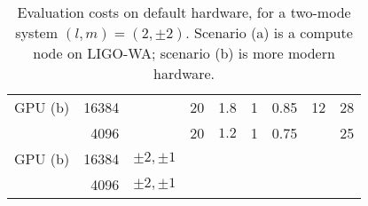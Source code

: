 \documentclass[twocolumn,prd,nofootinbib]{revtex4}
\begin{document}
\begin{table}
\begin{tabular}{lrr|ccccc|r}
GPU (b) & 16384 & & 20  & 1.8 & 1 & 0.85& 12 &28\\
       & 4096 & & 20 & $1.2 $ &  1  & 0.75 &  & 25\\ \hline
GPU (b) & 16384 & $\pm 2, \pm 1$ &  \\
       & 4096 & $\pm 2, \pm 1$ \\
\end{tabular}
\caption{\label{tab:CostBreakdown}Evaluation costs on default hardware, for a two-mode system $(l,m)=(2,\pm 2)$.  Scenario (a) is a compute node on LIGO-WA; scenario (b) is more modern hardware. }
\end{table}
\end{document}
